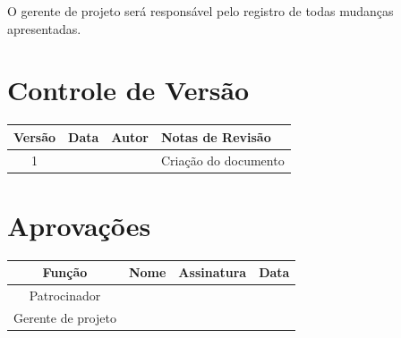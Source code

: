 O gerente de projeto será responsável pelo registro de todas mudanças apresentadas. 

\section{Controle de Versão}

\begin{table}[H]
	\begin{tabularx}{\textwidth}{| c | c | X | X |}
		\hline
		\textbf{Versão} & \textbf{Data} & \textbf{Autor}      & \textbf{Notas de Revisão} \\
		\hline
		1                &               & \projectManagerName & Criação do documento     \\
		\hline
	\end{tabularx}
	\centering
\end{table}

\section{Aprovações}

\begin{table}[H]
	\begin{tabularx}{\textwidth}{| c | c | X | c |}
		\hline
		\textbf{Função}  & \textbf{Nome}       & \textbf{Assinatura}      & \textbf{Data} \\
		\hline
		Patrocinador       & \projectSponsorName & \projectSponsorSignature &               \\
		\hline
		Gerente de projeto & \projectManagerName & \projectManagerSignature &               \\
		\hline
	\end{tabularx}
	\centering
\end{table}